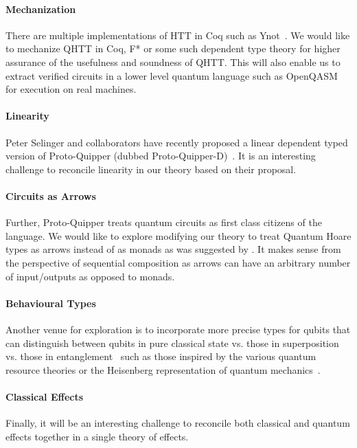 \documentclass[adraft,creativecommons]{eptcs}
\theoremstyle{definition}
\theoremstyle{remark}
\begin{document}
\paragraph{Mechanization} There are multiple implementations of HTT in Coq such as Ynot~\cite{ynot2008}. We would like to mechanize QHTT in Coq, F* or some such dependent type theory for higher assurance of the usefulness and soundness of QHTT. This will also enable us to extract verified circuits in a lower level quantum language such as OpenQASM~\cite{cross2017} for execution on real machines.

\paragraph{Linearity} Peter Selinger and collaborators have recently proposed a linear dependent typed version of Proto-Quipper (dubbed Proto-Quipper-D)~\cite{selinger2020,fu2020linear}. It is an interesting challenge to reconcile linearity in our theory based on their proposal.

\paragraph{Circuits as Arrows} Further, Proto-Quipper treats quantum circuits as first class citizens of the language. We would like to explore modifying our theory to treat Quantum Hoare types as arrows instead of as monads as was suggested by \cite{so-arrows}. It makes sense from the perspective of sequential composition as arrows can have an arbitrary number of input/outputs as opposed to monads.

\paragraph{Behavioural Types} Another venue for exploration is to incorporate more precise types for qubits that can distinguish between qubits in pure classical state vs. those in superposition vs. those in entanglement~\cite{JorrandPerdrix2009} such as those inspired by the various quantum resource theories or the Heisenberg representation of quantum mechanics~\cite{rssl2019,rssl20}.

\paragraph{Classical Effects} Finally, it will be an interesting challenge to reconcile both classical and quantum effects together in a single theory of effects.
\end{document}
